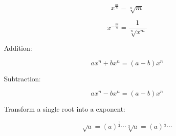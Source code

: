 \begin{definition}
    \begin{equation}
        x^{\frac{m}{n}} = \sqrt[n]{m} \label{eq-58}
    \end{equation}

    \begin{equation}
        x^{-\frac{m}{n}} = \frac{1}{\sqrt[n]{x^m}} \label{eq-59}
    \end{equation}

    Addition: %

    \begin{equation}
        ax^n + bx^n = (a+b)x^n \label{eq-60}
    \end{equation}

    Subtraction: 

    \begin{equation}
        ax^n - bx^n = (a-b)x^n \label{eq-61}
    \end{equation}

    Transform a single root into a exponent:

    \begin{equation}
        \sqrt{a} = (a)^{\frac{1}{2}} \cdots \sqrt[3]{a} = (a)^{\frac{1}{3}} \cdots \label{eq-62}
    \end{equation}

\end{definition}      

